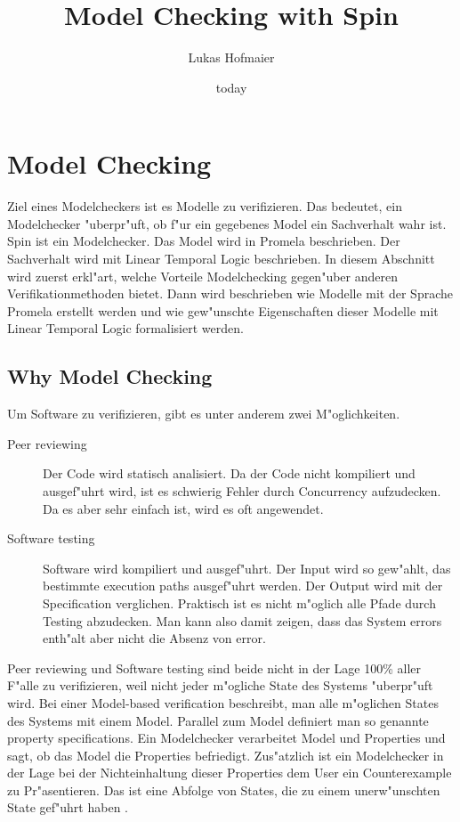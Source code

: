 \documentclass[11pt,twoside,a4paper]{article}
\begin{document}
\title{Model Checking with Spin}
\author{Lukas Hofmaier}
\date{today}
\maketitle

\tableofcontents

\section{Model Checking}
\label{sec:modelchecking}

Ziel eines Modelcheckers ist es Modelle zu verifizieren. Das bedeutet, ein Modelchecker "uberpr"uft, ob f"ur ein gegebenes Model ein Sachverhalt wahr ist. Spin ist ein Modelchecker. Das Model wird in Promela beschrieben. Der Sachverhalt wird mit Linear Temporal Logic beschrieben. In diesem Abschnitt wird zuerst erkl"art, welche Vorteile Modelchecking gegen"uber anderen Verifikationmethoden bietet. Dann wird beschrieben wie Modelle mit der Sprache Promela erstellt werden und wie gew"unschte Eigenschaften dieser Modelle mit Linear Temporal Logic formalisiert werden.

\subsection{Why Model Checking}
\label{sec:why}

Um Software zu verifizieren, gibt es unter anderem zwei M"oglichkeiten.
\begin{description}
\item[Peer reviewing] Der Code wird statisch analisiert. Da der Code nicht kompiliert und ausgef"uhrt wird, ist es schwierig Fehler durch Concurrency aufzudecken. Da es aber sehr einfach ist, wird es oft angewendet.
\item[Software testing] Software wird kompiliert und ausgef"uhrt. Der Input wird so gew"ahlt, das bestimmte execution paths ausgef"uhrt werden. Der Output wird mit der Specification verglichen. Praktisch ist es nicht m"oglich alle Pfade durch Testing abzudecken. Man kann also damit zeigen, dass das System errors enth"alt aber nicht die Absenz von error.
\end{description}

Peer reviewing und Software testing sind beide nicht in der Lage 100\% aller F"alle zu verifizieren, weil nicht jeder m"ogliche State des Systems "uberpr"uft wird. Bei einer Model-based verification beschreibt, man alle m"oglichen States des Systems mit einem Model. Parallel zum Model definiert man so genannte property specifications. Ein Modelchecker verarbeitet Model und Properties und sagt, ob das Model die Properties befriedigt. Zus"atzlich ist ein Modelchecker in der Lage bei der Nichteinhaltung dieser Properties dem User ein Counterexample zu Pr"asentieren. Das ist eine Abfolge von States, die zu einem unerw"unschten State gef"uhrt haben \cite{baier08}.
\end{document}
